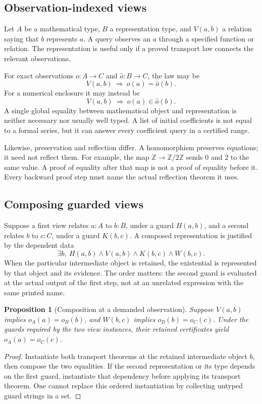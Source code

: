\documentclass[11pt,a4paper]{article}
\newcommand{\Z}{\mathbb Z}
\newtheorem{proposition}{Proposition}[section]
\theoremstyle{definition}
\begin{document}
\subsection{Observation-indexed views}
Let \(A\) be a mathematical type, \(B\) a representation type, and \(V(a,b)\) a relation saying that \(b\) represents \(a\). A query observes an \(a\) through a specified function or relation. The representation is useful only if a proved transport law connects the relevant observations.

For exact observations \(o:A\to C\) and \(\widehat o:B\to C\), the law may be
\[
       V(a,b)\ \Longrightarrow\ o(a)=\widehat o(b).
\]
For a numerical enclosure it may instead be
\[
       V(a,b)\ \Longrightarrow\ o(a)\in\widehat o(b).
\]
A single global equality between mathematical object and representation is neither necessary nor usually well typed. A list of initial coefficients is not equal to a formal series, but it can answer every coefficient query in a certified range.

Likewise, preservation and reflection differ. A homomorphism preserves equations; it need not reflect them. For example, the map \(\Z\to\Z/2\Z\) sends \(0\) and \(2\) to the same value. A proof of equality after that map is not a proof of equality before it. Every backward proof step must name the actual reflection theorem it uses.

\subsection{Composing guarded views}
Suppose a first view relates \(a:A\) to \(b:B\), under a guard \(H(a,b)\), and a second relates \(b\) to \(c:C\), under a guard \(K(b,c)\). A composed representation is justified by the dependent data
\[
  \exists b,\ H(a,b)\land V(a,b)\land K(b,c)\land W(b,c).
\]
When the particular intermediate object is retained, the existential is represented by that object and its evidence. The order matters: the second guard is evaluated at the actual output of the first step, not at an unrelated expression with the same printed name.

\begin{proposition}[Composition at a demanded observation]\label{prop:views}
Suppose \(V(a,b)\) implies \(o_A(a)=o_B(b)\), and \(W(b,c)\) implies \(o_B(b)=o_C(c)\). Under the guards required by the two view instances, their retained certificates yield \(o_A(a)=o_C(c)\).
\end{proposition}
\begin{proof}
Instantiate both transport theorems at the retained intermediate object \(b\), then compose the two equalities. If the second representation or its type depends on the first guard, instantiate that dependency before applying its transport theorem. One cannot replace this ordered instantiation by collecting untyped guard strings in a set.
\end{proof}
\end{document}
